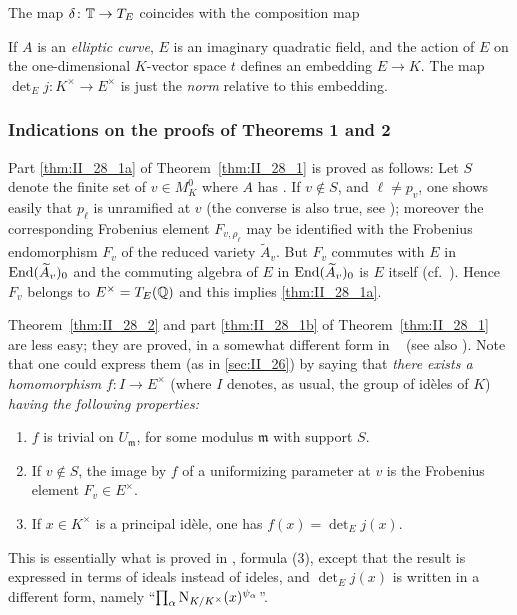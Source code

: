 \begin{thm}\label{thm:II_28_2}
The map $\delta\colon \mathbb{T} \to T_E$ coincides with the composition
map 
\end{thm}

\begin{ex}
If $A$ is an \emph{elliptic curve}, $E$ is an imaginary quadratic field, and
the action of $E$ on the one-dimensional $K$-vector space $t$ defines an
embedding $E \to K$. The map $\det_E j\colon K^\times \to E^\times$ is just the
\emph{norm} relative to this embedding.
\end{ex}

\subsubsection*{Indications on the proofs of Theorems 1 and 2}
Part \ref{thm:II_28_1a} of Theorem~\ref{thm:II_28_1} is proved as follows: Let
$S$ denote the finite set of $v \in M_K^0$ where $A$ has . If $v \notin S$, and
\dpage
$\ell \ne p_v$, one shows easily that $p_\ell$ is unramified at $v$ (the
converse is also true, see \cite{32}); moreover the corresponding Frobenius
element $F_{v, \rho_\ell}$ may be identified with the Frobenius endomorphism
$F_v$ of the reduced variety $\widetilde{A}_v$. But $F_v$ commutes with $E$ in
$\operatorname{End}(\widetilde{A}_v)_0$ and the commuting algebra of $E$ in
$\operatorname{End}(\widetilde{A}_v)_0$ is $E$ itself (cf.\ \cite[39]{34}). Hence $F_v$
belongs to $E^\times = T_E(\mathbb{Q})$ and this implies \ref{thm:II_28_1a}.

Theorem~\ref{thm:II_28_2} and part \ref{thm:II_28_1b} of
Theorem~\ref{thm:II_28_1} are less easy; they are proved, in a somewhat
different form in \citeauthor{34}~\cite{34} (see also \cite{32}). Note that one
could express them (as in \ref{sec:II_26}) by saying that \emph{there exists a
homomorphism} $f\colon I \to E^\times$ (where $I$ denotes, as usual, the group
of idèles of $K$) \emph{having the following properties:}
\begin{enumerate}
\item $f$ is trivial on $U_{\mathfrak{m}}$, for some modulus $\mathfrak{m}$
	with support $S$.
\item If $v \notin S$, the image by $f$ of a uniformizing parameter at
	$v$ is the Frobenius element $F_v \in E^\times$.
\item If $x \in K^\times$ is a principal idèle, one has $f(x) = \det_E j(x)$.
\end{enumerate}
This is essentially what is proved in \cite[148]{34}, formula (3),
except that the result is expressed in terms of ideals instead of
ideles, and $\det_E j(x)$ is written in a different form, namely
``$ \prod_{\alpha} \operatorname{N}_{K/K^\times}(x)^{\psi_\alpha} $''.

